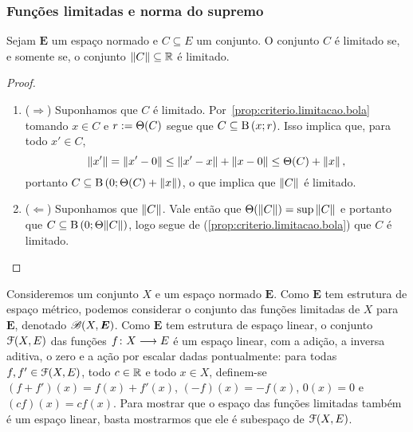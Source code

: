 \subsubsection{Funções limitadas e norma do supremo}

\begin{proposition}
\label{prop:criterio.limitacao.normada}
Sejam $\bm E$ um espaço normado e $C \subseteq E$ um conjunto. O conjunto $C$ é limitado se, e somente se, o conjunto $\left\Vert{C}\right\Vert \subseteq \mathbb{R}$ é limitado.
\end{proposition}
\begin{proof}
	\begin{enumerate}
	\item ($\Rightarrow$) Suponhamos que $C$ é limitado. Por~\ref{prop:criterio.limitacao.bola} tomando $x \in C$ e $r := \Theta(C)$ segue que $C \subseteq \mathrm{B}\left(x; r\right)$. Isso implica que, para todo $x' \in C$,
		\begin{equation*}
		\left\Vert{x'}\right\Vert = \left\Vert{x'-0}\right\Vert \leq \left\Vert{x'-x}\right\Vert + \left\Vert{x-0}\right\Vert \leq \Theta(C) + \left\Vert{x}\right\Vert,
		\end{equation*}
	portanto $C \subseteq \mathrm{B}\left(0; \Theta(C) + \left\Vert{x}\right\Vert\right)$, o que implica que $\left\Vert{C}\right\Vert$ é limitado.

	\item ($\Leftarrow$) Suponhamos que $\left\Vert{C}\right\Vert$. Vale então que $\Theta(\left\Vert{C}\right\Vert) = \sup\left\Vert{C}\right\Vert$ e portanto que $C \subseteq \mathrm{B}\left(0; \Theta{\left\Vert{C}\right\Vert}\right)$, logo segue de (\ref{prop:criterio.limitacao.bola}) que $C$ é limitado.
	\qedhere
	\end{enumerate}
\end{proof}


Consideremos um conjunto $X$ e um espaço normado $\bm E$. Como $\bm E$ tem estrutura de espaço métrico, podemos considerar o conjunto das funções limitadas de $X$ para $\bm E$, denotado $\mathscr{B}(X,\bm E)$. Como $\bm E$ tem estrutura de espaço linear, o conjunto $\mathcal{F}(X,E)$ das funções $f\colon \allowbreak X \longrightarrow E$ é um espaço linear, com a adição, a inversa aditiva, o zero e a ação por escalar dadas pontualmente: para todas $f,f' \in \mathcal{F}(X,E)$, todo $c \in \mathbb{R}$ e todo $x \in X$, definem-se $(f+f')(x) = f(x) + f'(x)$, $(-f)(x) = -f(x)$, $0(x) = 0$ e $(cf)(x) = cf(x)$.
Para mostrar que o espaço das funções limitadas também é um espaço linear, basta mostrarmos que ele é subespaço de $\mathcal{F}(X,E)$.

